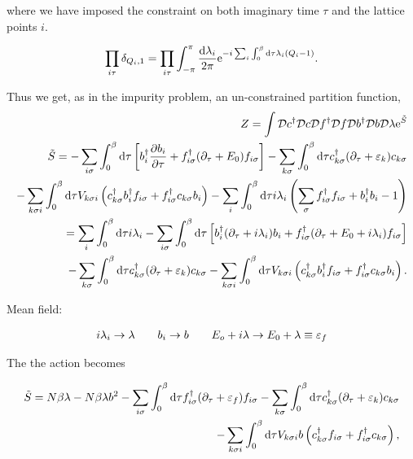 where we have imposed the constraint on both imaginary time $\tau$ and the lattice points $i$. 

\begin{align*}
    \prod_{i\tau} \delta_{Q_i, 1} = \prod_{i\tau} \int_{-\pi}^{\pi} \frac{\dd \lambda_i}{2\pi}\mathrm{e}^{-i\sum_i  \int_{0}^{\beta} \dd \tau \lambda_i(Q_i - 1) }.
\end{align*}


Thus we get, as in the impurity problem, an un-constrained partition function, 
\begin{align*}
    Z = \int \mathcal{D} c^{\dagger} \mathcal{D} c \mathcal{D} f^{\dagger} \mathcal{D} f \mathcal{D} b^{\dagger} \mathcal{D} b \mathcal{D} \lambda \mathrm{e}^{\Tilde{S}} \\ 
    \Tilde{S} = -\sum_{i\sigma} \int_{0}^{\beta} \dd \tau \left[ b^{\dagger}_i \pdv{b_i}{\tau} + f^{\dagger}_{i\sigma}(\partial_\tau + E_0)f_{i\sigma} \right] - \sum_{k\sigma} \int_{0}^{\beta} \dd \tau c^{\dagger}_{k\sigma}(\partial_\tau + \varepsilon_k)c_{k\sigma} \\ 
    - \sum_{k\sigma i} \int_{0}^{\beta} \dd \tau V_{k\sigma i}\left( c^{\dagger}_{k\sigma} b^{\dagger}_i f_{i\sigma} + f^{\dagger}_{i\sigma}c_{k\sigma} b_i \right) - \sum_i \int_{0}^{\beta} \dd \tau i\lambda_i \left(\sum_\sigma f^{\dagger}_{i\sigma}f_{i\sigma} + b^{\dagger}_i  b_i - 1\right) \\
    = \sum_i \int_{0}^{\beta} \dd \tau i\lambda_i -\sum_{i\sigma} \int_{0}^{\beta} \dd \tau \left[ b^{\dagger}_i (\partial_\tau + i\lambda_i)b_i  + f^{\dagger}_{i\sigma}(\partial_\tau + E_0 + i\lambda_i)f_{i\sigma} \right]  \\- \sum_{k\sigma} \int_{0}^{\beta} \dd \tau c^{\dagger}_{k\sigma}(\partial_\tau + \varepsilon_k)c_{k\sigma}  
    - \sum_{k\sigma i} \int_{0}^{\beta} \dd \tau V_{k\sigma i}\left( c^{\dagger}_{k\sigma} b^{\dagger}_i f_{i\sigma} + f^{\dagger}_{i\sigma}c_{k\sigma} b_i \right).
\end{align*}

Mean field: 

\begin{align*}
    i\lambda_i \to \lambda \quad \quad b_i \to b \quad \quad E_o + i\lambda \to E_0 + \lambda \equiv \varepsilon_f 
\end{align*}

The the action becomes 

\begin{align*}
    \Tilde{S} = N\beta\lambda - N\beta \lambda b^2 - \sum_{i\sigma} \int_{0}^{\beta} \dd \tau f^{\dagger}_{i\sigma}(\partial_\tau + \varepsilon_f)f_{i\sigma} - \sum_{k\sigma} \int_{0}^{\beta} \dd \tau c^{\dagger}_{k\sigma}(\partial_\tau + \varepsilon_k)c_{k\sigma} \\ 
    - \sum_{k\sigma i} \int_{0}^{\beta} \dd \tau  V_{k\sigma i}b\left( c^{\dagger}_{k\sigma}f_{i\sigma} + f^{\dagger}_{i\sigma}c_{k\sigma}\right), 
\end{align*}

